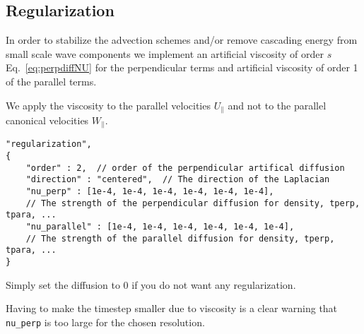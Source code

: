 \subsection{Regularization} \label{sec:regularization}
In order to stabilize the advection schemes and/or remove cascading energy
from small scale wave components
we implement an artificial viscosity of order $s$ Eq.~\eqref{eq:perpdiffNU}
for the perpendicular terms and artificial viscosity of order 1 of the parallel terms.
\begin{tcolorbox}[title=Note]
    We apply the viscosity to the parallel velocities $U_\parallel$ and
    not to the parallel canonical velocities $W_\parallel$.
\end{tcolorbox}
\begin{verbatim}
"regularization",
{
    "order" : 2,  // order of the perpendicular artifical diffusion
    "direction" : "centered",  // The direction of the Laplacian
    "nu_perp" : [1e-4, 1e-4, 1e-4, 1e-4, 1e-4, 1e-4],
    // The strength of the perpendicular diffusion for density, tperp, tpara, ...
    "nu_parallel" : [1e-4, 1e-4, 1e-4, 1e-4, 1e-4, 1e-4],
    // The strength of the parallel diffusion for density, tperp, tpara, ...
}
\end{verbatim}
Simply set the diffusion to 0 if you do not want any regularization.
\begin{tcolorbox}[title=Note]
    Having to make the timestep smaller due to viscosity
    is a clear warning that \texttt{nu_perp} is too large for the
    chosen resolution.
\end{tcolorbox}
